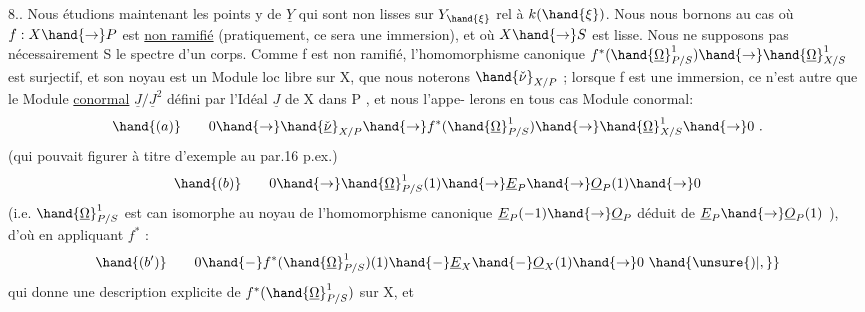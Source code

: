 
8.. Nous étudions maintenant les points  y de $\underline{Y}$ qui sont non lisses
sur $Y_{\hand{\xi}}$ rel à $k(\hand{\xi})$. Nous nous  bornons au cas où  $f:X\hand{\to} P$  est \uline{non ramifié}
(pratiquement, ce sera une immersion), et où $X\hand{\to} S$ est lisse.  Nous ne
supposons pas nécessairement S le spectre d'un corps.  
 Comme
f  est non ramifié, l'homomorphisme canonique   $f^*(\hand{\underline{\Omega}}^1_{P/S})\hand{\to}\hand{\underline{\Omega}}^1_{X/S}$
est surjectif, et son noyau est un Module loc libre sur X, que nous
noterons  $\hand{\check{\nu}}_{X/P}$ ; lorsque f est une immersion, ce n'est autre que le
Module \uline{conormal}  $\underline{J}/\underline{J}^2$  défini par l'Idéal $\underline{J}$ de X dans P , et nous l'appe-%
lerons en tous cas Module conormal:
\[ \hand{(a)} \qquad 0\hand{\to}\hand{\check{\underline{\nu}}}_{X/P}\hand{\to} f^*(\hand{\underline{\Omega}}^1_{P/S})\hand{\to}\hand{\underline{\Omega}}^1_{X/S}\hand{\to} 0 \ . \]
(qui pouvait figurer à titre d'exemple au par.16 p.ex.)
\[ \hand{(b)} \qquad 0\hand{\to}\hand{\underline{\Omega}}^1_{P/S}(1)\hand{\to}\underline{E}_P\hand{\to}\underline{O}_P(1)\hand{\to} 0 \]
(i.e. $\hand{\underline{\Omega}}^1_{P/S}$ est can isomorphe au noyau de l'homomorphisme canonique
$\underline{E}_P(-1)\hand{\to}\underline{O}_P$  déduit de $\underline{E}_P\hand{\to}\underline{O}_P(1)$ ), d'où en appliquant $f^*$ :
\[ \hand{(b')} \qquad 0 \hand{-} f^*(\hand{\underline{\Omega}}^1_{P/S})(1) \hand{-} \underline{E}_X \hand{-} \underline{O}_X(1)\hand{\to} 0 \ \hand{\unsure{)|,}} \]
qui donne une description explicite de  $f^*(\hand{\underline{\Omega}}^1_{P/S})$   sur X, et
